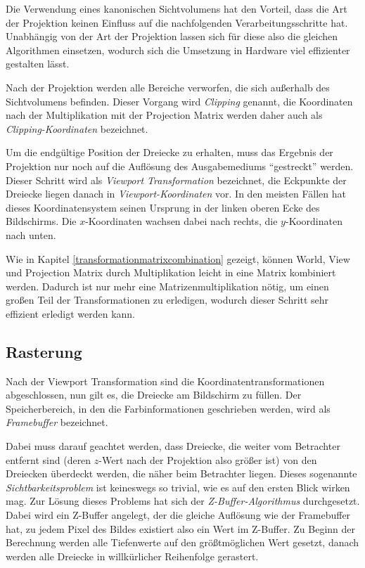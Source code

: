 Die Verwendung eines kanonischen Sichtvolumens hat den Vorteil, dass die Art der Projektion keinen Einfluss auf die nachfolgenden Verarbeitungsschritte hat. Unabhängig von der Art der Projektion lassen sich für diese also die gleichen Algorithmen einsetzen, wodurch sich die Umsetzung in Hardware viel effizienter gestalten lässt.

Nach der Projektion werden alle Bereiche verworfen, die sich außerhalb des Sichtvolumens befinden. Dieser Vorgang wird \emph{Clipping} genannt, die Koordinaten nach der Multiplikation mit der Projection Matrix werden daher auch als \emph{Clipping-Koordinaten} bezeichnet.

Um die endgültige Position der Dreiecke zu erhalten, muss das Ergebnis der Projektion nur noch auf die Auflösung des Ausgabemediums \enquote{gestreckt} werden. Dieser Schritt wird als \emph{Viewport Transformation} bezeichnet, die Eckpunkte der Dreiecke liegen danach in \emph{Viewport-Koordinaten} vor. In den meisten Fällen hat dieses Koordinatensystem seinen Ursprung in der linken oberen Ecke des Bildschirms. Die $x$-Koordinaten wachsen dabei nach rechts, die $y$-Koordinaten nach unten.

Wie in Kapitel \ref{transformationmatrixcombination} gezeigt, können World, View und Projection Matrix durch Multiplikation leicht in eine Matrix kombiniert werden. Dadurch ist nur mehr eine Matrizenmultiplikation nötig, um einen großen Teil der Transformationen zu erledigen, wodurch dieser Schritt sehr effizient erledigt werden kann.

\subsection{Rasterung}
Nach der Viewport Transformation sind die Koordinatentransformationen abgeschlossen, nun gilt es, die Dreiecke am Bildschirm zu füllen. Der Speicherbereich, in den die Farbinformationen geschrieben werden, wird als \emph{Framebuffer} bezeichnet.

Dabei muss darauf geachtet werden, dass Dreiecke, die weiter vom Betrachter entfernt sind (deren $z$-Wert nach der Projektion also größer ist) von den Dreiecken überdeckt werden, die näher beim Betrachter liegen. Dieses sogenannte \emph{Sichtbarkeitsproblem} ist keineswegs so trivial, wie es auf den ersten Blick wirken mag. Zur Lösung dieses Problems hat sich der \emph{Z-Buffer-Algorithmus} durchgesetzt. Dabei wird ein Z-Buffer angelegt, der die gleiche Auflösung wie der Framebuffer hat, zu jedem Pixel des Bildes existiert also ein Wert im Z-Buffer. Zu Beginn der Berechnung werden alle Tiefenwerte auf den größtmöglichen Wert gesetzt, danach werden alle Dreiecke in willkürlicher Reihenfolge gerastert.

